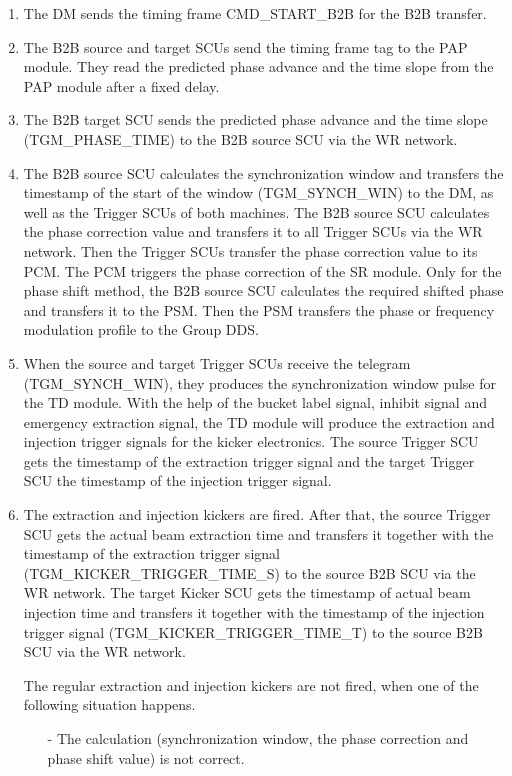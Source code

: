 \begin{enumerate}
\item The DM sends the timing frame CMD\_START\_B2B for the B2B transfer. 

\item  The B2B source and target SCUs send the timing frame tag to the PAP module. They read the predicted phase advance and the time slope from the PAP module after a fixed delay. 

\item  The B2B target SCU sends the predicted phase advance and the time slope (TGM\_PHASE\_TIME) to the B2B source SCU via the WR network. 

\item  The B2B source SCU calculates the synchronization window and transfers the timestamp of the start of the window (TGM\_SYNCH\_WIN) to the DM, as well as the Trigger SCUs of both machines.
The B2B source SCU calculates the phase correction value and transfers it to all Trigger SCUs via the WR network. Then the Trigger SCUs transfer the phase correction value to its PCM. The PCM triggers the phase correction of the SR module. 
Only for the phase shift method, the B2B source SCU calculates the required shifted phase and transfers it to the PSM. Then the PSM transfers the phase or frequency modulation profile to the Group DDS.  

\item  When the source and target Trigger SCUs receive the telegram (TGM\_SYNCH\_WIN), they produces the synchronization window pulse for the TD module. With the help of the bucket label signal, inhibit signal and emergency extraction signal, the TD module will produce the extraction and injection trigger signals for the kicker electronics.  
The source Trigger SCU gets the timestamp of the extraction trigger signal and the target Trigger SCU the timestamp of the injection trigger signal.
\item  The extraction and injection kickers are fired. 
After that, the source Trigger SCU gets the actual beam extraction time and transfers it together with the timestamp of the extraction trigger signal (TGM\_KICKER\_TRIGGER\_TIME\_S) to the source B2B SCU via the WR network.
The target Kicker SCU gets the timestamp of actual beam injection time and transfers it together with the timestamp of the injection trigger signal (TGM\_KICKER\_TRIGGER\_TIME\_T) to the source B2B SCU via the WR network.

The regular extraction and injection kickers are not fired, when one of the following situation happens. 
\begin{itemize}
\item[-] The calculation (synchronization window, the phase correction and phase shift value) is not correct. 


\end{itemize}
\end{enumerate}
